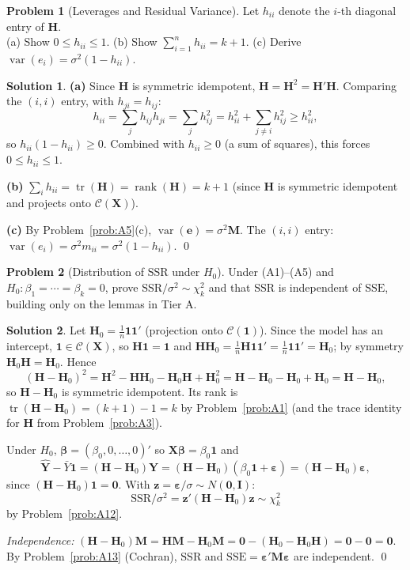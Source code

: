 \documentclass[12pt,a4paper]{article}
\theoremstyle{definition}
\newtheorem{exercise}{Problem}
\newtheorem*{solution*}{Solution}
\DeclareMathOperator\var{var}
\DeclareMathOperator\tr{tr}
\DeclareMathOperator\rank{rank}
\newcommand{\SSR}{\mathrm{SSR}}
\newcommand{\SSE}{\mathrm{SSE}}
\newcommand{\bX}{\mathbf{X}}
\newcommand{\bY}{\mathbf{Y}}
\def\bb{\boldsymbol{\beta}}
\newcommand{\be}{\boldsymbol{\varepsilon}}
\newcommand{\bI}{\mathbf{I}}
\newcommand{\bH}{\mathbf{H}}
\newcommand{\bM}{\mathbf{M}}
\newcommand{\bone}{\mathbf{1}}
\newcommand{\bzero}{\mathbf{0}}
\newcommand{\bz}{\mathbf{z}}
\newcommand{\calC}{\mathcal{C}}
\begin{document}
\begin{exercise}[Leverages and Residual Variance]\label{prob:B1}
Let $h_{ii}$ denote the $i$-th diagonal entry of $\bH$.\\
(a) Show $0 \leqslant h_{ii} \leqslant 1$. \; (b) Show $\sum_{i=1}^n h_{ii} = k+1$. \; (c) Derive $\var(e_i) = \sigma^2(1-h_{ii})$.
\end{exercise}

\begin{solution*}
\textbf{(a)} Since $\bH$ is symmetric idempotent, $\bH = \bH^2 = \bH'\bH$. Comparing the $(i,i)$ entry, with $h_{ji} = h_{ij}$:
\[
h_{ii} = \sum_j h_{ij}h_{ji} = \sum_j h_{ij}^2 = h_{ii}^2 + \sum_{j \neq i}h_{ij}^2 \geqslant h_{ii}^2,
\]
so $h_{ii}(1-h_{ii}) \geqslant 0$. Combined with $h_{ii} \geqslant 0$ (a sum of squares), this forces $0 \leqslant h_{ii} \leqslant 1$.

\textbf{(b)} $\sum_i h_{ii} = \tr(\bH) = \rank(\bH) = k+1$ (since $\bH$ is symmetric idempotent and projects onto $\calC(\bX)$).

\textbf{(c)} By Problem~\ref{prob:A5}(c), $\var(\mathbf{e}) = \sigma^2\bM$. The $(i,i)$ entry: $\var(e_i) = \sigma^2 m_{ii} = \sigma^2(1 - h_{ii})$. \qed
\end{solution*}

\begin{exercise}[Distribution of $\SSR$ under $H_0$]\label{prob:B2}
Under (A1)--(A5) and $H_0\colon \beta_1 = \cdots = \beta_k = 0$, prove $\SSR/\sigma^2 \sim \chi^2_k$ and that $\SSR$ is independent of $\SSE$, building only on the lemmas in Tier A.
\end{exercise}

\begin{solution*}
Let $\bH_0 = \frac{1}{n}\bone\bone'$ (projection onto $\calC(\bone)$). Since the model has an intercept, $\bone \in \calC(\bX)$, so $\bH\bone = \bone$ and $\bH\bH_0 = \frac{1}{n}\bH\bone\bone' = \frac{1}{n}\bone\bone' = \bH_0$; by symmetry $\bH_0\bH = \bH_0$. Hence
\[
(\bH - \bH_0)^2 = \bH^2 - \bH\bH_0 - \bH_0\bH + \bH_0^2 = \bH - \bH_0 - \bH_0 + \bH_0 = \bH - \bH_0,
\]
so $\bH-\bH_0$ is symmetric idempotent. Its rank is $\tr(\bH-\bH_0) = (k+1) - 1 = k$ by Problem~\ref{prob:A1} (and the trace identity for $\bH$ from Problem~\ref{prob:A3}).

Under $H_0$, $\bb = (\beta_0, 0, \ldots, 0)'$ so $\bX\bb = \beta_0\bone$ and
\[
\hat{\bY} - \bar Y\bone = (\bH - \bH_0)\bY = (\bH - \bH_0)(\beta_0\bone + \be) = (\bH - \bH_0)\be,
\]
since $(\bH-\bH_0)\bone = \bzero$. With $\bz = \be/\sigma \sim N(\bzero, \bI)$:
\[
\SSR/\sigma^2 = \bz'(\bH-\bH_0)\bz \sim \chi^2_k
\]
by Problem~\ref{prob:A12}.

\emph{Independence:} $(\bH-\bH_0)\bM = \bH\bM - \bH_0\bM = \bzero - (\bH_0 - \bH_0\bH) = \bzero - \bzero = \bzero$. By Problem~\ref{prob:A13} (Cochran), $\SSR$ and $\SSE = \be'\bM\be$ are independent. \qed
\end{solution*}
\end{document}
